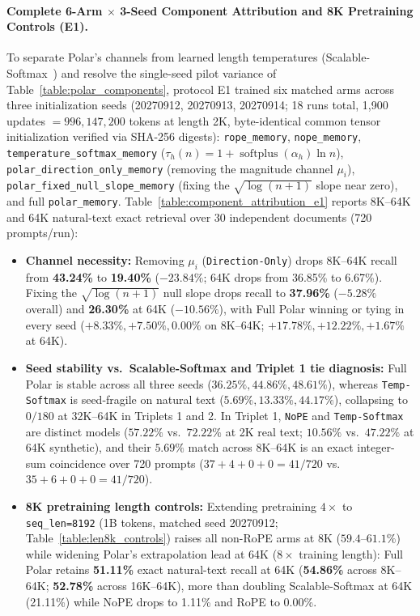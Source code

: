 \begin{revblock}
\paragraph{Complete 6-Arm $\times$ 3-Seed Component Attribution and 8K Pretraining Controls (E1).}
To separate Polar's channels from learned length temperatures (Scalable-Softmax~\citep{nakanishi2025scalable}) and resolve the single-seed pilot variance of Table~\ref{table:polar_components}, protocol E1 trained six matched arms across three initialization seeds (20270912, 20270913, 20270914; 18 runs total, 1,900 updates $=996{,}147{,}200$ tokens at length 2K, byte-identical common tensor initialization verified via SHA-256 digests): \texttt{rope\_memory}, \texttt{nope\_memory}, \texttt{temperature\_softmax\_memory} ($\tau_h(n)=1+\operatorname{softplus}(\alpha_h)\ln n$), \texttt{polar\_direction\_only\_memory} (removing the magnitude channel $\mu_i$), \texttt{polar\_fixed\_null\_slope\_memory} (fixing the $\sqrt{\log(n+1)}$ slope near zero), and full \texttt{polar\_memory}. Table~\ref{table:component_attribution_e1} reports 8K--64K and 64K natural-text exact retrieval over 30 independent documents (720 prompts/run):
\begin{itemize}
  \item \textbf{Channel necessity:} Removing $\mu_i$ (\texttt{Direction-Only}) drops 8K--64K recall from \textbf{43.24\%} to \textbf{19.40\%} ($-23.84\%$; 64K drops from 36.85\% to 6.67\%). Fixing the $\sqrt{\log(n+1)}$ null slope drops recall to \textbf{37.96\%} ($-5.28\%$ overall) and \textbf{26.30\%} at 64K ($-10.56\%$), with Full Polar winning or tying in every seed ($+8.33\%, +7.50\%, 0.00\%$ on 8K--64K; $+17.78\%, +12.22\%, +1.67\%$ at 64K).
  \item \textbf{Seed stability vs.\ Scalable-Softmax and Triplet 1 tie diagnosis:} Full Polar is stable across all three seeds ($36.25\%, 44.86\%, 48.61\%$), whereas \texttt{Temp-Softmax} is seed-fragile on natural text ($5.69\%, 13.33\%, 44.17\%$), collapsing to $0/180$ at 32K--64K in Triplets 1 and 2. In Triplet 1, \texttt{NoPE} and \texttt{Temp-Softmax} are distinct models ($57.22\%$ vs.\ $72.22\%$ at 2K real text; $10.56\%$ vs.\ $47.22\%$ at 64K synthetic), and their $5.69\%$ match across 8K--64K is an exact integer-sum coincidence over 720 prompts ($37+4+0+0=41/720$ vs.\ $35+6+0+0=41/720$).
  \item \textbf{8K pretraining length controls:} Extending pretraining $4\times$ to \texttt{seq\_len=8192} (1B tokens, matched seed 20270912; Table~\ref{table:len8k_controls}) raises all non-RoPE arms at 8K ($59.4$--$61.1\%$) while widening Polar's extrapolation lead at 64K ($8\times$ training length): Full Polar retains \textbf{51.11\%} exact natural-text recall at 64K (\textbf{54.86\%} across 8K--64K; \textbf{52.78\%} across 16K--64K), more than doubling Scalable-Softmax at 64K (21.11\%) while NoPE drops to 1.11\% and RoPE to 0.00\%.
\end{itemize}


\end{revblock}
